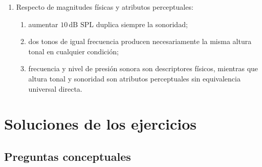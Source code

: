 \begin{enumerate}[label=\textbf{D\arabic*.},leftmargin=*]
    \item Respecto de magnitudes físicas y atributos perceptuales:
    \begin{enumerate}[label=\alph*)]
        \item aumentar \(10\,\text{dB SPL}\) duplica siempre la sonoridad;
        \item dos tonos de igual frecuencia producen necesariamente la misma
        altura tonal en cualquier condición;
        \item frecuencia y nivel de presión sonora son descriptores físicos,
        mientras que altura tonal y sonoridad son atributos perceptuales sin
        equivalencia universal directa.
    \end{enumerate}
\end{enumerate}

\section{Soluciones de los ejercicios}
\label{sec:u6-soluciones}

\subsection*{Preguntas conceptuales}

